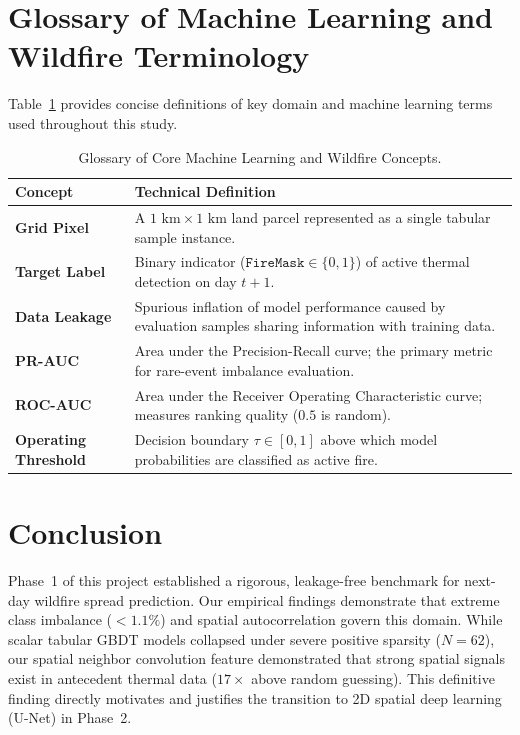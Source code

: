 \documentclass[10pt,journal,compsoc]{IEEEtran}
\begin{document}
\section{Glossary of Machine Learning and Wildfire Terminology}
Table~\ref{tab:glossary} provides concise definitions of key domain and machine learning terms used throughout this study.

\begin{table}[H]
\centering
\caption{Glossary of Core Machine Learning and Wildfire Concepts.}
\label{tab:glossary}
\begin{tabularx}{\columnwidth}{lX}
\toprule
\textbf{Concept} & \textbf{Technical Definition} \\
\midrule
\textbf{Grid Pixel} & A $1\text{ km} \times 1\text{ km}$ land parcel represented as a single tabular sample instance. \\
\textbf{Target Label} & Binary indicator ($\texttt{FireMask} \in \{0, 1\}$) of active thermal detection on day $t+1$. \\
\textbf{Data Leakage} & Spurious inflation of model performance caused by evaluation samples sharing information with training data. \\
\textbf{PR-AUC} & Area under the Precision-Recall curve; the primary metric for rare-event imbalance evaluation. \\
\textbf{ROC-AUC} & Area under the Receiver Operating Characteristic curve; measures ranking quality ($0.5$ is random). \\
\textbf{Operating Threshold} & Decision boundary $\tau \in [0, 1]$ above which model probabilities are classified as active fire. \\
\bottomrule
\end{tabularx}
\end{table}

\section{Conclusion}
Phase~1 of this project established a rigorous, leakage-free benchmark for next-day wildfire spread prediction. Our empirical findings demonstrate that extreme class imbalance ($< 1.1\%$) and spatial autocorrelation govern this domain. While scalar tabular GBDT models collapsed under severe positive sparsity ($N=62$), our spatial neighbor convolution feature demonstrated that strong spatial signals exist in antecedent thermal data ($17\times$ above random guessing). This definitive finding directly motivates and justifies the transition to 2D spatial deep learning (U-Net) in Phase~2.



\end{document}
